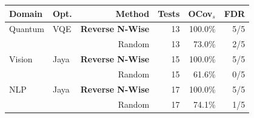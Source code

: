 \begin{tabular}{llrrrr}
\toprule
Domain & Opt. & Method & Tests & OCov$_s$ & FDR \\
\midrule
Quantum & VQE & \textbf{Reverse N-Wise} & 13 & 100.0\% & 5/5 \\
 &  & Random & 13 & 73.0\% & 2/5 \\
\midrule
Vision & Jaya & \textbf{Reverse N-Wise} & 15 & 100.0\% & 5/5 \\
 &  & Random & 15 & 61.6\% & 0/5 \\
\midrule
NLP & Jaya & \textbf{Reverse N-Wise} & 17 & 100.0\% & 5/5 \\
 &  & Random & 17 & 74.1\% & 1/5 \\
\bottomrule
\end{tabular}